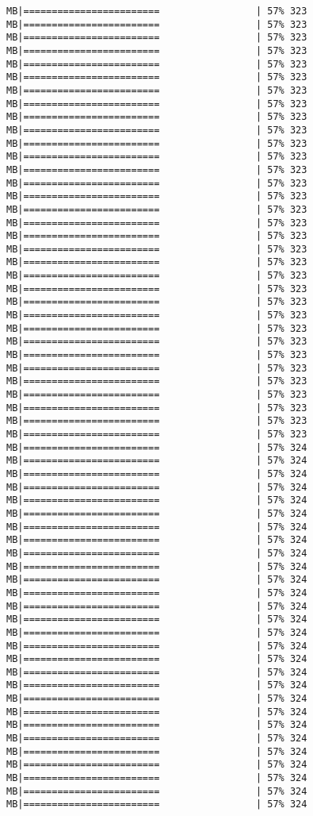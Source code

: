 \documentclass[
]{article}
\begin{document}
\begin{verbatim}
MB|========================                 | 57% 323 MB|========================                 | 57% 323 MB|========================                 | 57% 323 MB|========================                 | 57% 323 MB|========================                 | 57% 323 MB|========================                 | 57% 323 MB|========================                 | 57% 323 MB|========================                 | 57% 323 MB|========================                 | 57% 323 MB|========================                 | 57% 323 MB|========================                 | 57% 323 MB|========================                 | 57% 323 MB|========================                 | 57% 323 MB|========================                 | 57% 323 MB|========================                 | 57% 323 MB|========================                 | 57% 323 MB|========================                 | 57% 323 MB|========================                 | 57% 323 MB|========================                 | 57% 323 MB|========================                 | 57% 323 MB|========================                 | 57% 323 MB|========================                 | 57% 323 MB|========================                 | 57% 323 MB|========================                 | 57% 323 MB|========================                 | 57% 323 MB|========================                 | 57% 323 MB|========================                 | 57% 323 MB|========================                 | 57% 323 MB|========================                 | 57% 323 MB|========================                 | 57% 323 MB|========================                 | 57% 323 MB|========================                 | 57% 323 MB|========================                 | 57% 323 MB|========================                 | 57% 324 MB|========================                 | 57% 324 MB|========================                 | 57% 324 MB|========================                 | 57% 324 MB|========================                 | 57% 324 MB|========================                 | 57% 324 MB|========================                 | 57% 324 MB|========================                 | 57% 324 MB|========================                 | 57% 324 MB|========================                 | 57% 324 MB|========================                 | 57% 324 MB|========================                 | 57% 324 MB|========================                 | 57% 324 MB|========================                 | 57% 324 MB|========================                 | 57% 324 MB|========================                 | 57% 324 MB|========================                 | 57% 324 MB|========================                 | 57% 324 MB|========================                 | 57% 324 MB|========================                 | 57% 324 MB|========================                 | 57% 324 MB|========================                 | 57% 324 MB|========================                 | 57% 324 MB|========================                 | 57% 324 MB|========================                 | 57% 324 MB|========================                 | 57% 324 MB|========================                 | 57% 324 MB|========================                 | 57% 324 
\end{verbatim}
\end{document}
